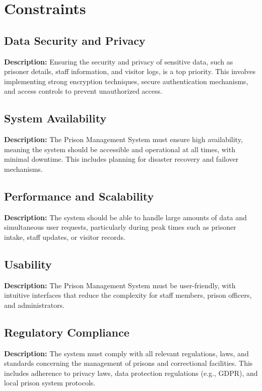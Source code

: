 \section{Constraints}

\subsection*{Data Security and Privacy}
\textbf{Description:} Ensuring the security and privacy of sensitive data, such as prisoner details, staff information, and visitor logs, is a top priority. This involves implementing strong encryption techniques, secure authentication mechanisms, and access controls to prevent unauthorized access.

\subsection*{System Availability}
\textbf{Description:} The Prison Management System must ensure high availability, meaning the system should be accessible and operational at all times, with minimal downtime. This includes planning for disaster recovery and failover mechanisms.

\subsection*{Performance and Scalability}
\textbf{Description:} The system should be able to handle large amounts of data and simultaneous user requests, particularly during peak times such as prisoner intake, staff updates, or visitor records.

\subsection*{Usability}
\textbf{Description:} The Prison Management System must be user-friendly, with intuitive interfaces that reduce the complexity for staff members, prison officers, and administrators.

\subsection*{Regulatory Compliance}
\textbf{Description:} The system must comply with all relevant regulations, laws, and standards concerning the management of prisons and correctional facilities. This includes adherence to privacy laws, data protection regulations (e.g., GDPR), and local prison system protocols.

